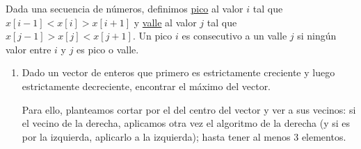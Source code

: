 \begin{ejercicio*}
    Dada una secuencia de números, definimos \ul{pico} al valor $i$ tal que $x[i-1] < x[i] > x[i+1]$ y \ul{valle} al valor $j$ tal que $x[j-1]>x[j]<x[j+1]$. Un pico $i$ es consecutivo a un valle $j$ si ningún valor entre $i$ y $j$ es pico o valle.

    \begin{enumerate}
        \item Dado un vector de enteros que primero es estrictamente creciente y luego estrictamente decreciente, encontrar el máximo del vector.

            Para ello, planteamos cortar por el del centro del vector y ver a sus vecinos: si el vecino de la derecha, aplicamos otra vez el algoritmo de la derecha (y si es por la izquierda, aplicarlo a la izquierda); hasta tener al menos 3 elementos.
    \end{enumerate}
\end{ejercicio*}
